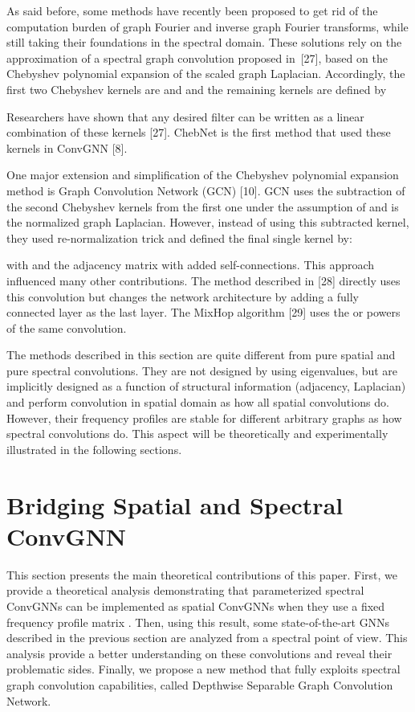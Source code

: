 \documentclass{article}
\begin{document}
As said before, some methods have recently been proposed to get rid of the computation burden of graph Fourier and inverse graph Fourier transforms, while still taking their foundations in the spectral domain. These solutions rely on the approximation of a spectral graph convolution proposed in~[27], based on the Chebyshev polynomial expansion of the scaled graph Laplacian. Accordingly, the first two Chebyshev kernels are  and
 and the remaining kernels are defined by 

Researchers have shown that any desired filter can be written as a linear combination of these kernels [27].
ChebNet is the first method that used these kernels in ConvGNN [8]. 

One major extension and simplification of the Chebyshev polynomial expansion method is Graph Convolution Network (GCN) [10]. GCN uses the subtraction of the second Chebyshev kernels from the first one under the assumption of  and  is the normalized graph Laplacian.  
However, instead of using this subtracted kernel, they used re-normalization trick and defined
the final single kernel by:


with  and  the adjacency matrix with added self-connections. 
This approach influenced many other contributions. The method
described in [28] directly uses this convolution but
changes the network architecture by adding a fully connected layer as the
last layer. The MixHop algorithm [29] uses the  or  powers of the same convolution. 

The methods described in this section are quite different from pure spatial and pure spectral convolutions. They are not designed by using eigenvalues, but are implicitly designed as a function of structural information (adjacency, Laplacian) and perform convolution in spatial domain as how all spatial convolutions do. However, their frequency profiles are stable for different arbitrary graphs as how spectral convolutions do.  This aspect will be theoretically and experimentally illustrated in the following sections.  

\section{Bridging Spatial and Spectral ConvGNN}

This section presents the main theoretical contributions of this paper. First, we provide  a theoretical analysis demonstrating that parameterized spectral ConvGNNs can be implemented as spatial ConvGNNs when they use a fixed frequency profile matrix . Then, using this result, some state-of-the-art GNNs described in the previous section are analyzed from a spectral point of view. This analysis provide a better understanding on these convolutions and reveal their problematic sides. Finally, we propose a new method that fully exploits spectral graph convolution capabilities, called Depthwise Separable Graph Convolution Network.
\end{document}
